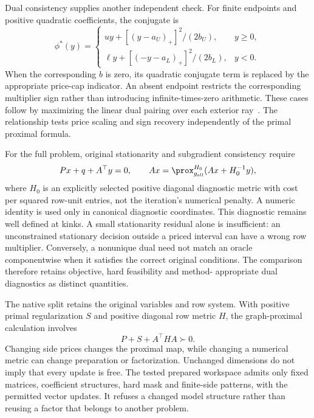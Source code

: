 Dual consistency supplies another independent check. For finite endpoints
and positive quadratic coefficients, the conjugate is
\begin{equation}\label{eq:paper-side-conjugate}
\phi^*(y)=\begin{cases}
 uy+[(y-a_U)_+]^2/(2b_U),&y\geq0,\\
 \ell y+[(-y-a_L)_+]^2/(2b_L),&y<0.
\end{cases}
\end{equation}
When the corresponding $b$ is zero, its quadratic conjugate term is
replaced by the appropriate price-cap indicator. An absent endpoint
restricts the corresponding multiplier sign rather than introducing
infinite-times-zero arithmetic. These cases follow by maximizing the
linear dual pairing over each exterior ray~\cite{rockafellar}. The
relationship tests price scaling and sign recovery independently of the
primal proximal formula.

For the full problem, original stationarity and subgradient consistency
require
\begin{equation}\label{eq:paper-side-kkt}
 Px+q+A^\top y=0,\qquad
 Ax=\prox_{g_{\mathrm{all}}}^{H_0}(Ax+H_0^{-1}y),
\end{equation}
where $H_0$ is an explicitly selected positive diagonal diagnostic metric
with cost per squared row-unit entries, not the iteration's numerical
penalty. A numeric identity is used only in canonical diagnostic coordinates.
This diagnostic remains well
defined at kinks. A small stationarity residual alone is insufficient:
an unconstrained stationary decision outside a priced interval can have
a wrong row multiplier. Conversely, a nonunique dual need not match an
oracle componentwise when it satisfies the correct original conditions.
The comparison therefore retains objective, hard feasibility and method-
appropriate dual diagnostics as distinct quantities.

The native split retains the original variables and row system. With
positive primal regularization $S$ and positive diagonal row metric $H$,
the graph-proximal calculation involves
\begin{equation}\label{eq:paper-original-system}
 P+S+A^\top H A\succ0.
\end{equation}
Changing side prices changes the proximal map, while changing a numerical
metric can change preparation or factorization. Unchanged dimensions do
not imply that every update is free. The tested prepared workspace admits
only fixed matrices, coefficient structures, hard mask and finite-side
patterns, with the permitted vector updates. It refuses a changed model
structure rather than reusing a factor that belongs to another problem.

